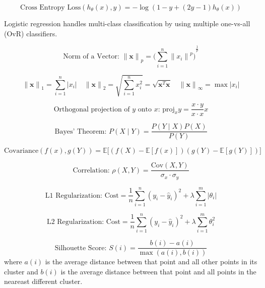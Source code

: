 \documentclass[twocolumn]{article}
\begin{document}
\[\text{Cross Entropy Loss}(h_\theta(x),y)=-\log(1-y+(2y-1)h_\theta(x))\]

Logistic regression handles multi-class classification by using multiple one-vs-all (OvR) classifiers.

\[\text{Norm of a Vector: }{\|\mathbf{x}\|}_p={\Bigg(\sum_{i=1}^n{\|x_i\|}^p\Bigg)}^\frac{1}{p}\]

\[{\|\mathbf{x}\|}_1 = \sum_{i=1}^n |x_i|\quad{\|\mathbf{x}\|}_2=\sqrt{\sum_{i=1}^n x_i^2} = \sqrt{\mathbf{x}^T\mathbf{x}}\quad{\|\mathbf{x}\|}_\infty=\max |x_i |\]

\[\text{Orthogonal projection of $y$ onto $x$: }\text{proj}_x y=\frac{x\cdot y}{x\cdot x}x\]

\[\text{Bayes' Theorem: }P(X\mid Y)=\frac{P(Y\mid X)P(X)}{P(Y)}\]

\[\text{Covariance}(f(x), g(Y))=\mathbb{E}\Big[(f(X)-\mathbb{E}[f(x)])(g(Y)-\mathbb{E}[g(Y)])\Big]\]

\[\text{Correlation: }\rho(X, Y)=\frac{\text{Cov}(X, Y)}{\sigma_x\cdot\sigma_y}\]

\[\text{L1 Regularization: }\text{Cost}=\frac{1}{n}\sum_{i=1}^n{(y_i-\hat{y}_i)}^2+\lambda\sum_{i=1}^m|\theta_i|\]

\[\text{L2 Regularization: }\text{Cost}=\frac{1}{n}\sum_{i=1}^n{(y_i-\hat{y}_i)}^2+\lambda\sum_{i=1}^m{\theta^2_i}\]

\[\text{Silhouette Score: }S(i)=\frac{b(i)-a(i)}{\max(a(i),b(i))}\] where $a(i)$ is the average distance between that point and all other points in its cluster and $b(i)$ is the average distance between that point and all points in the neareast different cluster.
\end{document}
